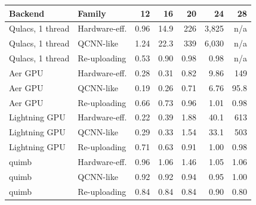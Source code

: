 \begin{tabular}{llrrrrr}
\toprule
Backend & Family & 12 & 16 & 20 & 24 & 28\\
\midrule
Qulacs, 1 thread & Hardware-eff. & 0.96 & 14.9 & 226 & 3{,}825 & n/a\\
Qulacs, 1 thread & QCNN-like & 1.24 & 22.3 & 339 & 6{,}030 & n/a\\
Qulacs, 1 thread & Re-uploading & 0.53 & 0.90 & 0.98 & 0.98 & n/a\\
Aer GPU & Hardware-eff. & 0.28 & 0.31 & 0.82 & 9.86 & 149\\
Aer GPU & QCNN-like & 0.19 & 0.26 & 0.71 & 6.76 & 95.8\\
Aer GPU & Re-uploading & 0.66 & 0.73 & 0.96 & 1.01 & 0.98\\
Lightning GPU & Hardware-eff. & 0.22 & 0.39 & 1.88 & 40.1 & 613\\
Lightning GPU & QCNN-like & 0.29 & 0.33 & 1.54 & 33.1 & 503\\
Lightning GPU & Re-uploading & 0.71 & 0.63 & 0.91 & 1.00 & 0.98\\
quimb & Hardware-eff. & 0.96 & 1.06 & 1.46 & 1.05 & 1.06\\
quimb & QCNN-like & 0.92 & 0.92 & 0.94 & 0.95 & 1.00\\
quimb & Re-uploading & 0.84 & 0.84 & 0.84 & 0.90 & 0.80\\
\bottomrule
\end{tabular}
